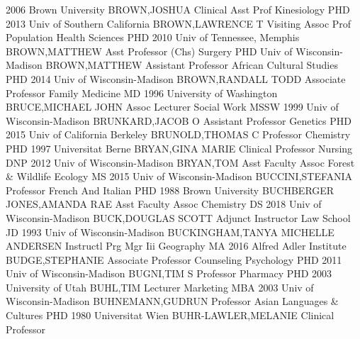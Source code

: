 \documentclass[
]{article}
\begin{document}
2006 Brown University \textbar BROWN,JOSHUA \textbar Clinical Asst Prof
\textbar Kinesiology \textbar{}  \textbar PHD 2013 Univ of
Southern California \textbar BROWN,LAWRENCE T \textbar Visiting Assoc
Prof \textbar Population Health Sciences \textbar{} 
\textbar PHD 2010 Univ of Tennessee, Memphis \textbar BROWN,MATTHEW
\textbar Asst Professor (Chs) \textbar Surgery \textbar{} 
\textbar PHD Univ of Wisconsin-Madison \textbar BROWN,MATTHEW
\textbar Assistant Professor \textbar African Cultural Studies
\textbar{}  \textbar PHD 2014 Univ of Wisconsin-Madison
\textbar BROWN,RANDALL TODD \textbar Associate Professor \textbar Family
Medicine \textbar{}  \textbar MD 1996 University of
Washington \textbar BRUCE,MICHAEL JOHN \textbar Assoc Lecturer
\textbar Social Work \textbar{}  \textbar MSSW 1999 Univ of
Wisconsin-Madison \textbar BRUNKARD,JACOB O \textbar Assistant Professor
\textbar Genetics \textbar{}  \textbar PHD 2015 Univ of
California Berkeley \textbar BRUNOLD,THOMAS C \textbar Professor
\textbar Chemistry \textbar{}  \textbar PHD 1997 Universitat
Berne \textbar BRYAN,GINA MARIE \textbar Clinical Professor
\textbar Nursing \textbar{}  \textbar DNP 2012 Univ of
Wisconsin-Madison \textbar BRYAN,TOM \textbar Asst Faculty Assoc
\textbar Forest \& Wildlife Ecology \textbar{}  \textbar MS
2015 Univ of Wisconsin-Madison \textbar BUCCINI,STEFANIA
\textbar Professor \textbar French And Italian \textbar{} 
\textbar PHD 1988 Brown University \textbar BUCHBERGER JONES,AMANDA RAE
\textbar Asst Faculty Assoc \textbar Chemistry \textbar{} 
\textbar DS 2018 Univ of Wisconsin-Madison \textbar BUCK,DOUGLAS SCOTT
\textbar Adjunct Instructor \textbar Law School \textbar{} 
\textbar JD 1993 Univ of Wisconsin-Madison \textbar BUCKINGHAM,TANYA
MICHELLE ANDERSEN \textbar Instructl Prg Mgr Iii \textbar Geography
\textbar{}  \textbar MA 2016 Alfred Adler Institute
\textbar BUDGE,STEPHANIE \textbar Associate Professor
\textbar Counseling Psychology \textbar{}  \textbar PHD 2011
Univ of Wisconsin-Madison \textbar BUGNI,TIM S \textbar Professor
\textbar Pharmacy \textbar{}  \textbar PHD 2003 University of
Utah \textbar BUHL,TIM \textbar Lecturer \textbar Marketing \textbar{}
 \textbar MBA 2003 Univ of Wisconsin-Madison
\textbar BUHNEMANN,GUDRUN \textbar Professor \textbar Asian Languages \&
Cultures \textbar{}  \textbar PHD 1980 Universitat Wien
\textbar BUHR-LAWLER,MELANIE \textbar Clinical Professor
\end{document}
